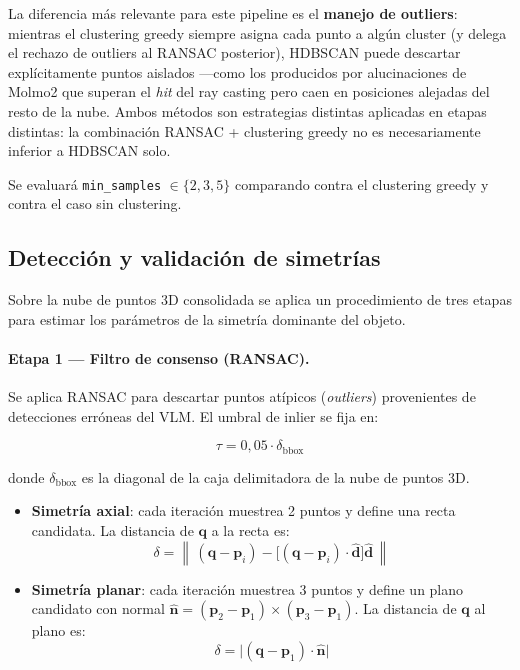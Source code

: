La diferencia más relevante para este pipeline es el \textbf{manejo de outliers}:
mientras el clustering greedy siempre asigna cada punto a algún cluster (y delega
el rechazo de outliers al RANSAC posterior), HDBSCAN puede descartar
explícitamente puntos aislados —como los producidos por alucinaciones de Molmo2
que superan el \textit{hit} del ray casting pero caen en posiciones alejadas del
resto de la nube. Ambos métodos son estrategias distintas aplicadas en etapas
distintas: la combinación RANSAC + clustering greedy no es necesariamente inferior
a HDBSCAN solo.

Se evaluará \texttt{min\_samples} $\in \{2, 3, 5\}$ comparando contra el
clustering greedy y contra el caso sin clustering.

\newpage
\subsection{Detección y validación de simetrías}

Sobre la nube de puntos 3D consolidada se aplica un procedimiento de tres etapas
para estimar los parámetros de la simetría dominante del objeto.

\paragraph{Etapa 1 — Filtro de consenso (RANSAC).}
Se aplica RANSAC para descartar puntos atípicos (\textit{outliers}) provenientes
de detecciones erróneas del VLM. El umbral de inlier se fija en:

\begin{equation}
    \tau = 0{,}05 \cdot \delta_{\text{bbox}}
\end{equation}

donde $\delta_{\text{bbox}}$ es la diagonal de la caja delimitadora de la nube
de puntos 3D.

\begin{itemize}
    \item \textbf{Simetría axial}: cada iteración muestrea 2 puntos y define
          una recta candidata. La distancia de $\mathbf{q}$ a la recta es:
          \begin{equation}
              \delta = \left\|\,(\mathbf{q} - \mathbf{p}_i)
                          - \bigl[(\mathbf{q}-\mathbf{p}_i)\cdot\hat{\mathbf{d}}\bigr]
                          \hat{\mathbf{d}}\,\right\|
          \end{equation}

    \item \textbf{Simetría planar}: cada iteración muestrea 3 puntos y define un
          plano candidato con normal
          $\hat{\mathbf{n}} = (\mathbf{p}_2-\mathbf{p}_1)\times(\mathbf{p}_3-\mathbf{p}_1)$.
          La distancia de $\mathbf{q}$ al plano es:
          \begin{equation}
              \delta = \bigl|(\mathbf{q} - \mathbf{p}_1)\cdot\hat{\mathbf{n}}\bigr|
          \end{equation}
\end{itemize}

